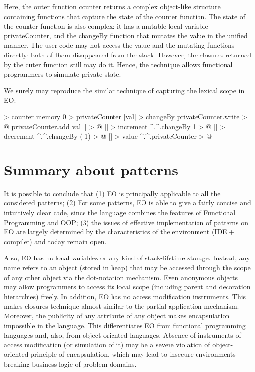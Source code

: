 \documentclass[12pt]{book}
\begin{document}
Here, the outer function counter returns a complex object-like structure containing functions that capture the state of the counter function. The state of the counter function is also complex: it has a mutable local variable privateCounter, and the changeBy function that mutates the value in the unified manner. The user code may not access the value and the mutating functions directly: both of them disappeared from the stack. However, the closures returned by the outer function still may do it. Hence, the technique allows functional programmers to simulate private state. 

We surely may reproduce the similar technique of capturing the lexical scope in EO:
\begin{ffcode}
[] > counter
  memory 0 > privateCounter
  [val] > changeBy
    privateCounter.write > @
      privateCounter.add val
  [] > @
    [] > increment
      ^.^.changeBy 1 > @
    [] > decrement
      ^.^.changeBy (-1) > @
    [] > value
      ^.^.privateCounter > @

\end{ffcode}

\section{Summary about patterns}
It is possible to conclude that (1) EO is principally applicable to all the considered patterns; (2) For some patterns, EO is able to give a fairly concise and intuitively clear code, since the language combines the features of Functional Programming and OOP; (3) the issues of effective implementation of patterns on EO are largely determined by the characteristics of the environment (IDE + compiler) and today remain open.

Also, EO has no local variables or any kind of stack-lifetime storage. Instead, any name refers to an object (stored in heap) that may be accessed through the scope of any other object via the dot-notation mechanism. Even anonymous objects may allow programmers to access its local scope (including parent and decoration hierarchies) freely. In addition, EO has no access modification instruments. This makes closures technique almost similar to the partial application mechanism. Moreover, the publicity of any attribute of any object makes encapsulation impossible in the language. This differentiates EO from functional programming languages and, also, from object-oriented languages. Absence of instruments of access modification (or simulation of it) may be a severe violation of object-oriented principle of encapsulation, which may lead to insecure environments breaking business logic of problem domains.
\end{document}
